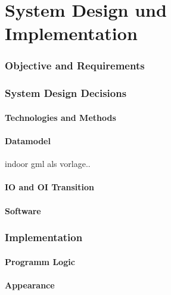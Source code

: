 \chapter{System Design und Implementation}
\subsection{Objective and Requirements} %

\subsection{System Design Decisions}
\subsubsection{Technologies and Methods}
\subsubsection{Datamodel}
indoor gml als vorlage..
\subsubsection{IO and OI Transition}
\subsubsection{Software}
\subsection{Implementation} 
\subsubsection{Programm Logic} %
\subsubsection{Appearance} %
